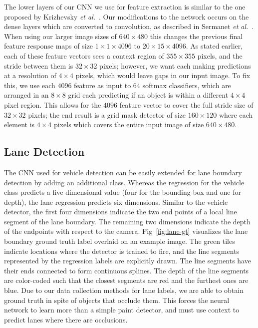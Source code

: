 \documentclass[journal]{IEEEtran}
\begin{document}
The lower layers of our CNN we use for feature extraction is similar to the one proposed by Krizhevsky \textit{et al.}~\cite{krizhevsky-2012}. Our modifications to the network occurs on the dense layers which are converted to convolution, as described in Sermanet \textit{et al.}~\cite{sermanet-2013}. When using our larger image sizes of $640 \times 480$ this changes the previous final feature response maps of size $1\times 1\times 4096$ to $20 \times 15 \times 4096$. As stated earlier, each of these feature vectors sees a context region of $355 \times 355$ pixels, and the stride between them is $32 \times 32$ pixels; however, we want each making predictions at a resolution of $4 \times 4$ pixels, which would leave gaps in our input image. To fix this, we use each $4096$ feature as input to $64$ softmax classifiers, which are arranged in an $8 \times 8$ grid each predicting if an object is within a different $4 \times 4$ pixel region. This allows for the $4096$ feature vector to cover the full stride size of $32 \times 32$ pixels; the end result is a grid mask detector of size $160 \times 120$ where each element is $4 \times 4$ pixels which covers the entire input image of size $640 \times 480$. 

\subsection{Lane Detection}
The CNN used for vehicle detection can be easily extended for lane boundary detection by adding an additional class. Whereas the regression for the vehicle class predicts a five dimensional value (four for the bounding box and one for depth), the lane regression predicts six dimensions. Similar to the vehicle detector, the first four dimensions indicate the two end points of a local line segment of the lane boundary. The remaining two dimensions 
indicate the depth of the endpoints with respect to the camera. Fig~\ref{fig:lane-gt} visualizes the lane boundary ground truth label overlaid on an example image. The green tiles indicate locations where the detector is trained to fire, and the line segments represented by the regression labels are explicitly drawn. The line segments have their ends connected to form continuous splines. The depth of the line segments are color-coded such that the closest segments are red and the furthest ones are blue. Due to our data collection methods for lane labels, we are able to obtain ground truth in spite of objects that occlude them. This forces the neural network to learn more than a simple paint detector, and must use context to predict lanes where there are occlusions. 
\end{document}
